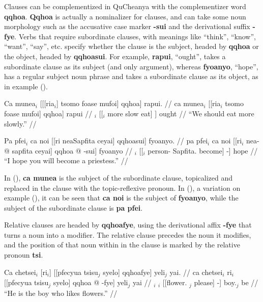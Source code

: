\documentclass{article}
\begin{document}
Clauses can be complementized in QuCheanya with the complementizer word \textbf{qqhoa}.  \textbf{Qqhoa} is actually a nominalizer for clauses, and can take some noun morphology such as the accusative case marker \textbf{-sui} and the derivational suffix \textbf{-fye}.  Verbs that require subordinate clauses, with meanings like ``think'', ``know'', ``want'', ``say'', etc. specify whether the clause is the subject, headed by \textbf{qqhoa} or the object, headed by \textbf{qqhoasui}.  For example, \textbf{rapui}, ``ought'', takes a subordinate clause as its subject (and only argument), whereas \textbf{fyoanyo}, ``hope'', has a regular subject noun phrase and takes a subordinate clause as its object, as in example ().

\ex[lingstyle=QuCheanya,tag=ought] \begingl
\glpreamble Ca munea$_i$ [[[ria$_i$] tsomo foase mufoi] qqhoa] rapui. //
\gla ca munea$_i$ [[ria$_i$ tsomo foase mufoi] qqhoa] rapui //
\glb {} $_i$ [[$_i$ more slow eat] ] ought //
\glft ``We should eat more slowly.'' //
\endgl \xe

\ex[lingstyle=QuCheanya,tag=hopeyou] \begingl
\glpreamble Pa pfei$_i$ ca noi [[ri neaSapfita ceyai] qqhoasui] fyoanyo. //
\gla pa pfei$_i$ ca noi [[ri$_i$ nea- @ sapfita ceyai] qqhoa @ -sui] fyoanyo //
\glb {} $_i$   [[$_i$ person- Sapfita. become]  -] hope //
\glft ``I hope you will become a priestess.'' //
\endgl \xe

In (), \textbf{ca munea} is the subject of the subordinate clause, topicalized and replaced in the clause with the topic-reflexive pronoun.  In (), a variation on example (), it can be seen that \textbf{ca noi} is the subject of \textbf{fyoanyo}, while the subject of the subordinate clause is \textbf{pa pfei}.

Relative clauses are headed by \textbf{qqhoafye}, using the derivational affix \textbf{-fye} that turns a noun into a modifier.  The relative clause precedes the noun it modifies, and the position of that noun within in the clause is marked by the relative pronoun \textbf{tsi}.

\ex[lingstyle=QuCheanya] \begingl
\glpreamble Ca chetsei$_i$ [ri$_i$] [[pfecyua tsisu$_j$ syelo] qqhoafye] yeli$_j$ yai. //
\gla ca chetsei$_i$ ri$_i$ [[pfecyua tsisu$_j$ syelo] qqhoa @ -fye] yeli$_j$ yai //
\glb {} $_i$ $_i$ [[flower. $_j$ please]  -] boy.$_j$ be //
\glft ``He is the boy who likes flowers.'' //
\endgl \xe
\end{document}
